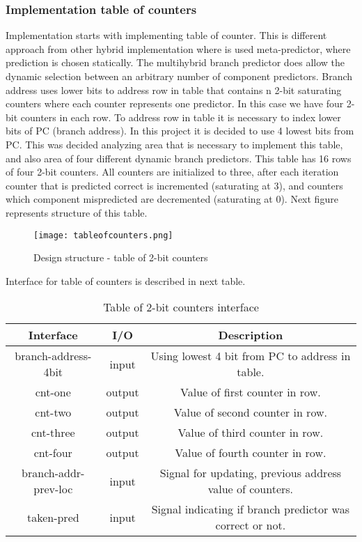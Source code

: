 \documentclass{scrreprt}
\begin{document}
\subsubsection*{Implementation table of counters}
Implementation starts with implementing table of counter. This is different approach from other hybrid implementation where is used meta-predictor, where prediction is chosen statically. The multihybrid branch predictor does allow the dynamic selection between an arbitrary number of component predictors. Branch address uses lower bits to address row in table that contains n 2-bit saturating counters where each counter represents one predictor. In this case we have four 2-bit counters in each row. 
To address row in table it is necessary to index lower bits of PC (branch address). In this project it is decided to use 4 lowest bits from PC. This was decided analyzing area that is necessary to implement this table, and also area of four different dynamic branch predictors. 
This table has 16 rows of four 2-bit counters. All counters are initialized to three, after each iteration counter that is predicted correct is incremented (saturating at 3), and counters which component mispredicted are decremented (saturating at 0). 
Next figure represents structure of this table. 
\begin{figure}[ht]
    \centering
    \texttt{[image: tableofcounters.png]}
    \caption{Design structure - table of 2-bit counters}
    \label{fig:c1}
\end{figure}
\newline
\newline
\newline
\newline
Interface for table of counters is described in next table.
    \begin{table}[htb!]
            \centering
            \begin{tabular}{|c|c|c|} \hline 
             Interface & I/O & Description \\ \hline  
             branch-address-4bit & input & Using lowest 4 bit from PC to address in table. \\ \hline  
             cnt-one & output & Value of first counter in row.  \\ \hline
             cnt-two & output & Value of second counter in row. \\ \hline
             cnt-three & output & Value of third counter in row. \\ \hline
             cnt-four & output & Value of fourth counter in row. \\ \hline
             branch-addr-prev-loc & input & Signal for updating, previous address value of counters. \\ \hline
             taken-pred & input & Signal indicating if branch predictor was correct or not. \\ \hline
        \end{tabular}
        \caption{Table of 2-bit counters interface}
        \label{tab:Ct}
    \end{table}
\end{document}
